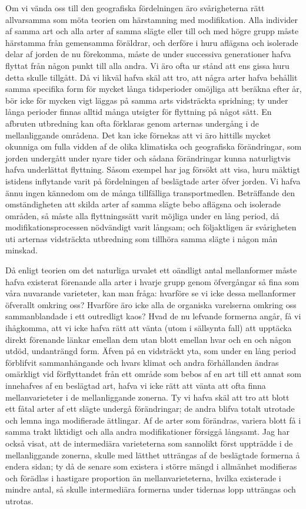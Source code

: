 Om vi vända oss till den geografiska fördelningen äro svårigheterna rätt allvarsamma som möta teorien om härstamning med modifikation. Alla individer af samma art och alla arter af samma slägte eller till och med högre grupp måste härstamma från gemensamma föräldrar, och derföre i huru aflägsna och isolerade delar af jorden de nu förekomma, måste de under successiva generationer hafva flyttat från någon punkt till alla andra. Vi äro ofta ur stånd att ens gissa huru detta skulle tillgått. Då vi likväl hafva skäl att tro, att några arter hafva behållit samma specifika form för mycket långa tidsperioder omöjliga att beräkna efter år, bör icke för mycken vigt läggas på samma arts vidsträckta spridning; ty under långa perioder finnas alltid många utsigter för flyttning på något sätt. En afbruten utbredning kan ofta förklaras genom arternas undergång i de mellanliggande områdena. Det kan icke förnekas att vi äro hittills mycket okunniga om fulla vidden af de olika klimatiska och geografiska förändringar, som jorden undergått under nyare tider och sådana förändringar kunna naturligtvis hafva underlättat flyttning. Såsom exempel har jag försökt att visa, huru mäktigt istidens inflytande varit på fördelningen af beslägtade arter öfver jorden. Vi hafva ännu ingen kännedom om de många tillfälliga transportmedlen. Beträffande den omständigheten att skilda arter af samma slägte bebo aflägsna och isolerade områden, så måste alla flyttningssätt varit möjliga under en lång period, då modifikationsprocessen nödvändigt varit långsam; och följaktligen är svårigheten uti arternas vidsträckta utbredning som tillhöra samma slägte i någon mån minskad.

Då enligt teorien om det naturliga urvalet ett oändligt antal mellanformer måste hafva existerat förenande alla arter i hvarje grupp genom öfvergångar så fina som våra nuvarande varieteter, kan man fråga: hvarföre se vi icke dessa mellanformer öfverallt omkring oss? Hvarföre äro icke alla de organiska varelserna omkring oss sammanblandade i ett outredligt kaos? Hvad de nu lefvande formerna angår, få vi ihågkomma, att vi icke hafva rätt att vänta (utom i sällsynta fall) att upptäcka direkt förenande länkar emellan dem utan blott emellan hvar och en och någon utdöd, undanträngd form. Äfven på en vidsträckt yta, som under en lång period förblifvit sammanhängande och hvars klimat och andra förhållanden ändras omärkligt vid förflyttandet från ett område som bebos af en art till ett annat som innehafves af en beslägtad art, hafva vi icke rätt att vänta att ofta finna mellanvarieteter i de mellanliggande zonerna. Ty vi hafva skäl att tro att blott ett fåtal arter af ett slägte undergå förändringar; de andra blifva totalt utrotade och lemna inga modifierade ättlingar. Af de arter som förändras, variera blott få i samma trakt liktidigt och alla andra modifikationer försiggå långsamt. Jag har också visat, att de intermediära varieteterna som sannolikt först uppträdde i de mellanliggande zonerna, skulle med lätthet utträngas af de beslägtade formerna å endera sidan; ty då de senare som existera i större mängd i allmänhet modifieras och förädlas i hastigare proportion än mellanvarieteterna, hvilka existerade i mindre antal, så skulle intermediära formerna under tidernas lopp utträngas och utrotas.

